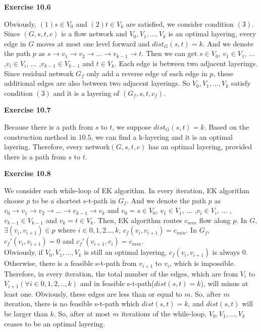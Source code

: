 \documentclass{article} %
\begin{document}
	
	\textbf{Exercise 10.6}\par
	Obviously, $(1)s\in V_{0}$ and $(2)t\in V_{k}$ are satisfied, we consider condition $(3)$. Since $(G,s,t,c)$ is a flow network 
	and $V_{0},V_{1},...,V_{k}$ is an optimal layering, every edge in $G$ moves at most one level forward and $dist_G(s,t)=k$. And we denote the path $p$ 
	as $s\rightarrow v_{1}\rightarrow v_{2} \rightarrow ...\rightarrow v_{k-1} \rightarrow t $. Then we can get  $s\in V_{0}$, $v_{1}\in V_{1}$, ... ,$v_{i}\in V_{i}$, ... ,$v_{k-1}\in V_{k-1}$ and $t\in V_{k}$. Each edge is between two adjacent layerings. Since residual network $G_{f}$ only add a reverse edge of each edge in $p$, these additional edges are also between two adjacent layerings. So $V_{0},V_{1},...,V_{k}$ satisfy condition $(3)$ and it is a layering of $(G_{f},s,t,c_{f})$.\par

    \textbf{Exercise 10.7}\par
    Because there is a path from $s$ to $t$, we suppose $dist_G(s,t)=k$. Based on the construction method in $10.5$, we can find a k-layering and it is an optimal layering. Therefore, every network$(G,s,t,c)$ has an optimal layering, provided there is a path from $s$ to $t$.
	
	\textbf{Exercise 10.8}\par
	We consider each while-loop of EK algorithm. In every iteration, EK algorithm choose $p$ to be a shortest s-t-path in $G_{f}$. 
	And we denote the path $p$ as $v_{0}\rightarrow v_{1}\rightarrow v_{2} \rightarrow ...\rightarrow v_{k-1} \rightarrow v_{k} $ and $v_{0}=s\in V_{0}$, $v_{1}\in V_{1}$, ... ,$v_{i}\in V_{i}$, ... ,$v_{k-1}\in V_{k-1}$ and $v_{k}=t\in V_{k}$. Then, EK algorithm routes $c_{min}$ flow along $p$. In $G$, $\exists (v_{i},v_{i+1})\in p$ where $i\in {0,1,2...,k}$, $c_{f}(v_{i},v_{i+1})=c_{min}$. In $G_{f}$, $c_{f}'(v_{i},v_{i+1})=0$ and  $c_{f}'(v_{i+1},v_{i})=c_{min}$. \\
	Obviously, if  $V_{0},V_{1},...,V_{k}$ is still an optimal layering, $c_{f}(v_{i},v_{i+1})$ is always $0$. Otherwise, there is a feasible s-t-path from $v_{i+1}$ to $v_{i}$, which is impossible. Therefore, in every iteration, the total number of the edges, which are from $V_{i}$ to $V_{i+1} (\forall i \in{0,1,2,..,k})$ and in feasible s-t-path($dist(s,t)=k$), will minus at least one. Obviously, these edges are less than or equal to $m$. So, after $m$ iteration, there is no feasible s-t-path which $dist(s,t)=k$, and $dist(s,t)$ will be larger than $k$. So, after at most $m$ iterations of  the while-loop, $V_{0},V_{1},...,V_{k}$ ceases to be an optimal layering.\par
	
\end{document}
